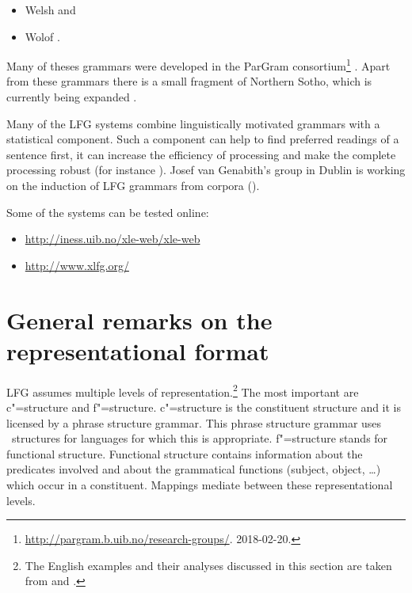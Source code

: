 \begin{itemize}
\item Welsh \citep{MS2005a-u}
and
\item Wolof \citep{Dione2012b-u,Dione2013a-u}.
\end{itemize}
Many of theses grammars were developed in the ParGram consortium\footnote{%
  \url{http://pargram.b.uib.no/research-groups/}. 2018-02-20.
} \citep*{BKNS99a-ed,BDKMR02a-u}. Apart from these grammars there is a small fragment of Northern
Sotho, which is currently being expanded \citep{Faasz2010a-u}. 


Many of the LFG systems combine linguistically motivated grammars with a statistical
component. Such a component can help to find preferred readings of a sentence first,
it can increase the efficiency of processing and make the complete processing robust (for instance
\citealp{KRKMVC2004a-u,RKKCMJ2002a-u}). Josef van Genabith's group in Dublin is working on the induction of
LFG grammars from corpora (\eg \citealp{JGCCR99a-u,DBCGW2005a-u,CBFDRCW2005a-u,CG2006a-u,GWG2007a-u,CBDRGW2008a-u,SG2009a-u}). 

\pagebreak
Some of the systems can be tested online:
\begin{itemize}
\item \url{http://iness.uib.no/xle-web/xle-web}

\item \url{http://www.xlfg.org/}
\end{itemize}




\section{General remarks on the representational format}
\label{Abschnitt-Format-LFG}

LFG assumes multiple levels of representation.\footnote{%
	The English examples and their analyses discussed in this section are taken from
        \citet{Dalrymple2001a-u} and \citet{Dalrymple2006a}.
} The most important are c"=structure and f"=structure. c"=structure is the constituent
structure and it is licensed by a phrase structure grammar. This phrase structure grammar uses
\xbar~structures for languages for which this is appropriate. f"=structure stands for functional structure. Functional structure contains information about the predicates involved
and about the grammatical functions (subject, object, \ldots) which occur in a constituent. Mappings
mediate between these representational levels.



